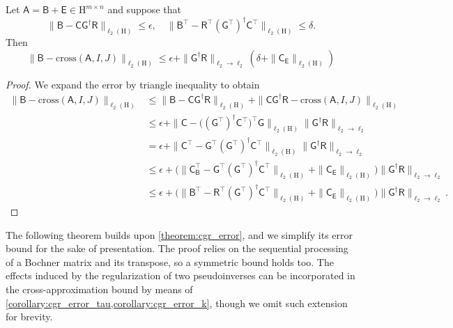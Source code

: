 \documentclass[onefignum,onetabnum]{siamart250211}
\renewenvironment{equation*}{\[}{\]\ignorespacesafterend}
\newcommand{\Hilb}{\mathrm{H}}
\newcommand{\Batrix}[1]{\bm{\Matrix{#1}}}
\newcommand{\Matrix}[1]{\mathsf{#1}}
\newcommand{\trans}{\intercal}
\newcommand{\pinv}{\dagger}
\newcommand{\Index}[1]{{#1}}
\newcommand{\cross}[3][]{\mathrm{cross}#1(#2, #3 #1)}
\newcommand{\Norm}[3][]{#1\| #2 #1\|_{\mathrm{#3}}}
\begin{document}
\begin{lemma}
\label{lemma:cross_l2_error}
Let $\Batrix{A} = \Batrix{B} + \Batrix{E} \in \Hilb^{m \times n}$ and suppose that
\begin{equation*}
    \Norm{\Batrix{B} - \Batrix{C} \Batrix{G}^\pinv \Batrix{R}}{\ell_2(\Hilb)} \leq \epsilon, \quad \Norm{\Batrix{B}^\trans - \Batrix{R}^\trans (\Batrix{G}^\trans)^\pinv \Batrix{C}^\trans}{\ell_2(\Hilb)} \leq \delta.
\end{equation*}
Then
\begin{equation*}
    \Norm{\Batrix{B} - \cross{\Batrix{A}}{\Index{I}, \Index{J}}}{\ell_2(\Hilb)} \leq \epsilon + \Norm{\Batrix{G}^\pinv \Batrix{R}}{\ell_2 \to \ell_2} (\delta + \Norm{\Batrix{C}_{\Batrix{E}}}{\ell_2(\Hilb)})
\end{equation*}
\end{lemma}
\begin{proof}
We expand the error by triangle inequality to obtain
\begin{align*}
    \Norm{\Batrix{B} - \cross{\Batrix{A}}{\Index{I}, \Index{J}}}{\ell_2(\Hilb)} &\leq \Norm{\Batrix{B} - \Batrix{C} \Batrix{G}^\pinv \Batrix{R}}{\ell_2(\Hilb)} + \Norm{\Batrix{C} \Batrix{G}^\pinv \Batrix{R} - \cross{\Batrix{A}}{\Index{I}, \Index{J}}}{\ell_2(\Hilb)} \\
    &\leq \epsilon + \Norm{\Batrix{C} - \big( (\Batrix{G}^\trans)^\pinv \Batrix{C}^\trans \big)^\trans \Batrix{G}}{\ell_2(\Hilb)} \Norm{\Batrix{G}^\pinv \Batrix{R}}{\ell_2 \to \ell_2} \\
    &= \epsilon + \Norm{\Batrix{C}^\trans - \Batrix{G}^\trans (\Batrix{G}^\trans)^\pinv \Batrix{C}^\trans}{\ell_2(\Hilb)} \Norm{\Batrix{G}^\pinv \Batrix{R}}{\ell_2 \to \ell_2} \\
    &\leq \epsilon + \big( \Norm{\Batrix{C}_{\Batrix{B}}^\trans - \Batrix{G}^\trans (\Batrix{G}^\trans)^\pinv \Batrix{C}^\trans}{\ell_2(\Hilb)} + \Norm{\Batrix{C}_{\Batrix{E}}}{\ell_2(\Hilb)} \big) \Norm{\Batrix{G}^\pinv \Batrix{R}}{\ell_2 \to \ell_2} \\
    &\leq \epsilon + \big( \Norm{\Batrix{B}^\trans - \Batrix{R}^\trans (\Batrix{G}^\trans)^\pinv \Batrix{C}^\trans}{\ell_2(\Hilb)} + \Norm{\Batrix{C}_{\Batrix{E}}}{\ell_2(\Hilb)} \big) \Norm{\Batrix{G}^\pinv \Batrix{R}}{\ell_2 \to \ell_2}.
\end{align*}
\end{proof}

The following theorem builds upon \cref{theorem:cgr_error}, and we simplify its error bound for the sake of presentation.
The proof relies on the sequential processing of a Bochner matrix and its transpose, so a symmetric bound holds too.
The effects induced by the regularization of two pseudoinverses can be incorporated in the cross-approximation bound by means of \cref{corollary:cgr_error_tau,corollary:cgr_error_k}, though we omit such extension for brevity.
\end{document}
